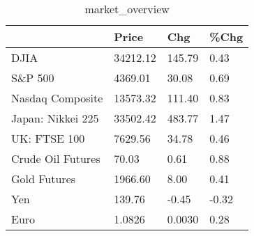 \documentclass{article}%
\begin{document}
%


\begin{table}[htbp]%
\caption{market\_overview}%
\centering%
\begin{adjustbox}{width=1\textwidth}%
\begin{tabular}{llll}
\toprule
                  &    Price &    Chg &  \%Chg \\
\midrule
             DJIA & 34212.12 & 145.79 &  0.43 \\
          S\&P 500 &  4369.01 &  30.08 &  0.69 \\
 Nasdaq Composite & 13573.32 & 111.40 &  0.83 \\
Japan: Nikkei 225 & 33502.42 & 483.77 &  1.47 \\
     UK: FTSE 100 &  7629.56 &  34.78 &  0.46 \\
Crude Oil Futures &    70.03 &   0.61 &  0.88 \\
     Gold Futures &  1966.60 &   8.00 &  0.41 \\
              Yen &   139.76 &  -0.45 & -0.32 \\
             Euro &   1.0826 & 0.0030 &  0.28 \\
\bottomrule
\end{tabular}
%
\end{adjustbox}%
\end{table}

%
\end{document}
